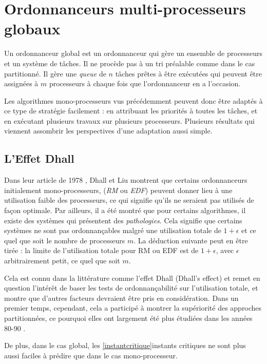 \documentclass[11pt,a4paper,oneside]{report}
\begin{document}
	\section{Ordonnanceurs multi-processeurs globaux}
	Un ordonnanceur global est un ordonnanceur qui gère un ensemble de processeurs et 
	un système de tâches. Il ne procède pas à un tri préalable comme dans le cas partitionné. 
	Il gère une \textit{queue} de $n$ tâches prêtes à être exécutées 
	qui peuvent être assignées à $m$ processeurs à chaque fois que l'ordonnanceur en a l'occasion.\medskip
	
	Les algorithmes mono-processeurs vus précédemment peuvent donc être adaptés 
	à ce type de stratégie facilement : en attribuant les priorités à toutes les tâches, et en 
	exécutant plusieurs travaux sur plusieurs processeurs. 
	Plusieurs résultats qui viennent assombrir les perspectives d'une adaptation aussi simple. \medskip
	
	\subsection{L'Effet Dhall}
	Dans leur article de 1978 \cite{dhall_real-time_1978}, Dhall et Liu montrent que certains ordonnanceurs 
	initialement mono-processeurs, (\textit{RM} ou \textit{EDF}) peuvent donner lieu à une utilisation faible des 
	processeurs, ce qui signifie qu'ils ne seraient pas utilisés de façon optimale.\medskip 
	Par ailleurs, il a été montré que pour certains algorithmes, 
	il existe des systèmes qui présentent des \textit{pathologies}.
	Cela signifie que certains systèmes ne sont pas ordonnançables malgré une 
	utilisation totale de $1 + \epsilon$ et ce quel que soit le nombre de processeurs $m$.
	La déduction suivante peut en être tirée : la limite de l'utilisation totale 
	pour RM ou EDF est de $1 + \epsilon$, avec $\epsilon$ arbitrairement petit, ce 
	quel que soit $m$. 
	
	Cela est connu dans la littérature comme l'\og effet Dhall\fg{}  (Dhall's effect) et remet en 
	question l'intérêt de baser les tests de ordonnançabilité sur l'utilisation totale, et 
	montre que d'autres facteurs devraient être pris en considération. Dans un premier temps, cependant, 
	cela a participé à montrer la supériorité des approches partitionnées, ce pourquoi elles ont 
	largement été plus étudiées dans les années 80-90 \cite{davis_survey_2011}.\medskip
	
	De plus, dans le cas global, les \ref{instantcritique}{instants critiques} ne sont plus aussi faciles à prédire 
	que dans le cas mono-processeur. \medskip
	
\end{document}
